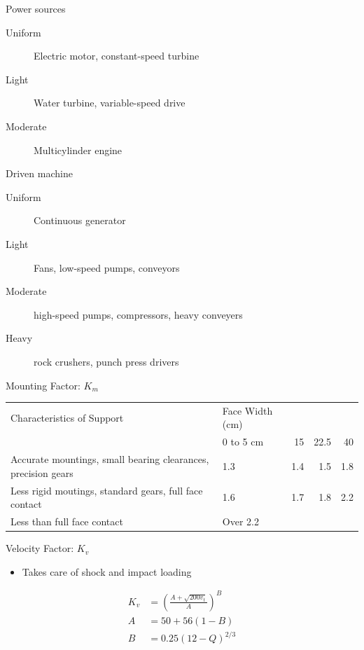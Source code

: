 \documentclass[a4paper,openany]{tufte-book}
\begin{document}
Power sources

\begin{description}
\item[{Uniform}] Electric motor, constant-speed turbine

\item[{Light}] Water turbine, variable-speed drive

\item[{Moderate}] Multicylinder engine
\end{description}

Driven machine

\begin{description}
\item[{Uniform}] Continuous generator

\item[{Light}] Fans, low-speed pumps, conveyors

\item[{Moderate}] high-speed pumps, compressors, heavy conveyers

\item[{Heavy}] rock crushers, punch press drivers
\end{description}

Mounting Factor: \(K_{m}\)

\begin{center}
\begin{tabular}{llrrr}
Characteristics of Support & Face Width (cm) &  &  & \\
 & 0 to 5 cm & 15 & 22.5 & 40\\
Accurate mountings, small bearing clearances, precision gears & 1.3 & 1.4 & 1.5 & 1.8\\
Less rigid moutings, standard gears, full face contact & 1.6 & 1.7 & 1.8 & 2.2\\
Less than full face contact & Over 2.2 &  &  & \\
\end{tabular}
\end{center}

Velocity Factor: \(K_{v}\)

\begin{itemize}
\item Takes care of shock and impact loading
\end{itemize}

\begin{align}
    K_{v} &= \left( \frac{A + \sqrt{200 v_{t}}}{A} \right)^{B} \\
    A &= 50 + 56(1 - B) \\
    B &= 0.25(12 - Q)^{2/3}
  \end{align}
\end{document}

